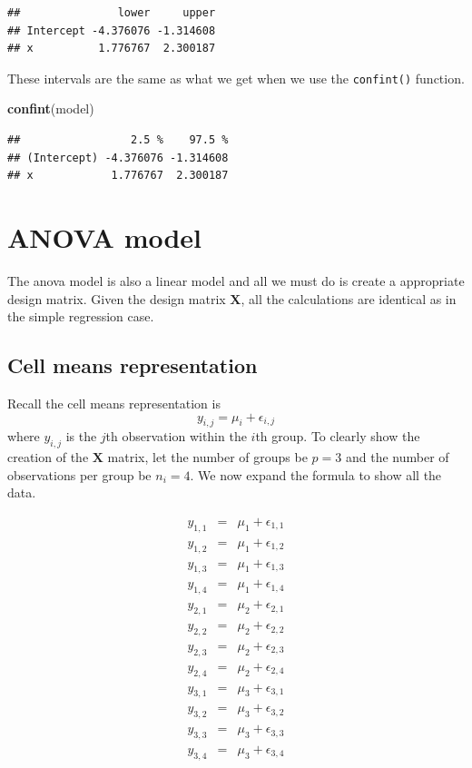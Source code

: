 \documentclass[]{book}
\newenvironment{Shaded}{\begin{snugshade}}{\end{snugshade}}
\newcommand{\KeywordTok}[1]{\textcolor[rgb]{0.13,0.29,0.53}{\textbf{{#1}}}}
\newcommand{\NormalTok}[1]{{#1}}
\theoremstyle{definition}
\theoremstyle{definition}
\theoremstyle{remark}
\begin{document}
\begin{verbatim}
##               lower     upper
## Intercept -4.376076 -1.314608
## x          1.776767  2.300187
\end{verbatim}

These intervals are the same as what we get when we use the
\texttt{confint()} function.

\begin{Shaded}
\begin{Highlighting}[]
\KeywordTok{confint}\NormalTok{(model)}
\end{Highlighting}
\end{Shaded}

\begin{verbatim}
##                 2.5 %    97.5 %
## (Intercept) -4.376076 -1.314608
## x            1.776767  2.300187
\end{verbatim}

\section{ANOVA model}\label{anova-model}

The anova model is also a linear model and all we must do is create a
appropriate design matrix. Given the design matrix \(\boldsymbol{X}\),
all the calculations are identical as in the simple regression case.

\subsection{Cell means representation}\label{cell-means-representation}

Recall the cell means representation is \[
y_{i,j}=\mu_{i}+\epsilon_{i,j}
\] where \(y_{i,j}\) is the \(j\)th observation within the \(i\)th
group. To clearly show the creation of the \(\boldsymbol{X}\) matrix,
let the number of groups be \(p=3\) and the number of observations per
group be \(n_{i}=4\). We now expand the formula to show all the data.

\begin{eqnarray*}
y_{1,1} & = & \mu_{1}+\epsilon_{1,1}\\
y_{1,2} & = & \mu_{1}+\epsilon_{1,2}\\
y_{1,3} & = & \mu_{1}+\epsilon_{1,3}\\
y_{1,4} & = & \mu_{1}+\epsilon_{1,4}\\
y_{2,1} & = & \mu_{2}+\epsilon_{2,1}\\
y_{2,2} & = & \mu_{2}+\epsilon_{2,2}\\
y_{2,3} & = & \mu_{2}+\epsilon_{2,3}\\
y_{2,4} & = & \mu_{2}+\epsilon_{2,4}\\
y_{3,1} & = & \mu_{3}+\epsilon_{3,1}\\
y_{3,2} & = & \mu_{3}+\epsilon_{3,2}\\
y_{3,3} & = & \mu_{3}+\epsilon_{3,3}\\
y_{3,4} & = & \mu_{3}+\epsilon_{3,4}
\end{eqnarray*}
\end{document}
